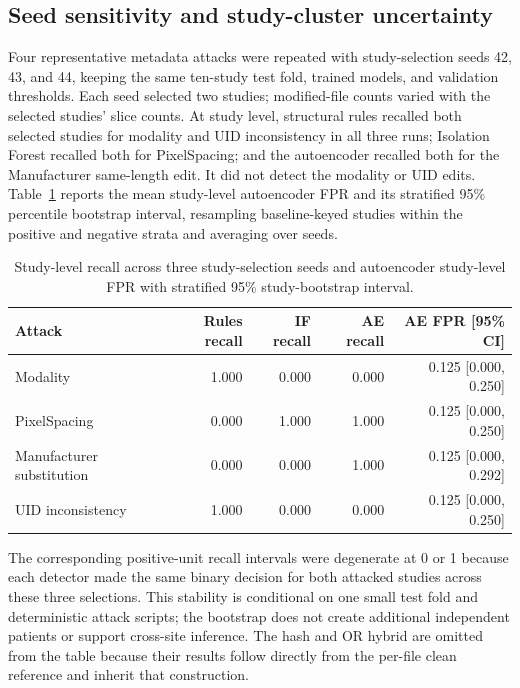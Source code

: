 \documentclass[journal]{IEEEtran}
\begin{document}
  \subsection{Seed sensitivity and study-cluster uncertainty}
  Four representative metadata attacks were repeated with study-selection seeds 42, 43, and 44, keeping the same ten-study test fold, trained models, and validation thresholds. Each seed selected two studies; modified-file counts varied with the selected studies' slice counts. At study level, structural rules recalled both selected studies for modality and UID inconsistency in all three runs; Isolation Forest recalled both for PixelSpacing; and the autoencoder recalled both for the Manufacturer same-length edit. It did not detect the modality or UID edits. Table~\ref{tab:seed_sensitivity} reports the mean study-level autoencoder FPR and its stratified 95\% percentile bootstrap interval, resampling baseline-keyed studies within the positive and negative strata and averaging over seeds.
  
  \begin{table}[t]
  \caption{Study-level recall across three study-selection seeds and autoencoder study-level FPR with stratified 95\% study-bootstrap interval.}
  \label{tab:seed_sensitivity}
  \centering\scriptsize
  \begin{tabular}{lrrrr}
  \toprule
  Attack & Rules recall & IF recall & AE recall & AE FPR [95\% CI] \\
  \midrule
  Modality & 1.000 & 0.000 & 0.000 & 0.125 [0.000, 0.250] \\
  PixelSpacing & 0.000 & 1.000 & 1.000 & 0.125 [0.000, 0.250] \\
  Manufacturer substitution & 0.000 & 0.000 & 1.000 & 0.125 [0.000, 0.292] \\
  UID inconsistency & 1.000 & 0.000 & 0.000 & 0.125 [0.000, 0.250] \\
  \bottomrule
  \end{tabular}
  \end{table}
  
  The corresponding positive-unit recall intervals were degenerate at 0 or 1 because each detector made the same binary decision for both attacked studies across these three selections. This stability is conditional on one small test fold and deterministic attack scripts; the bootstrap does not create additional independent patients or support cross-site inference. The hash and OR hybrid are omitted from the table because their results follow directly from the per-file clean reference and inherit that construction.
  
\end{document}
